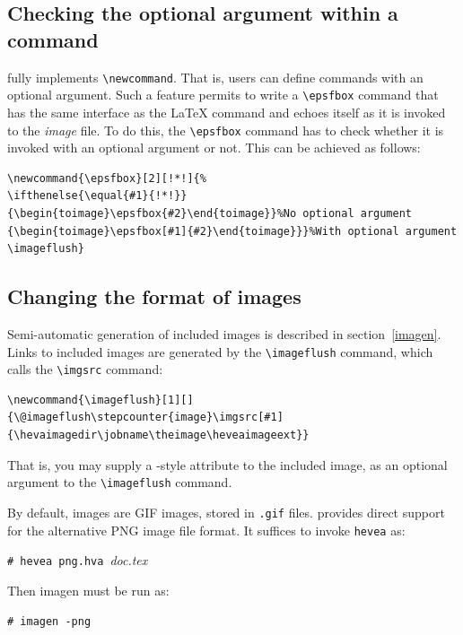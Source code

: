 \subsection{Checking the optional argument within a command}\label{fullepsfbox}
\hevea{} fully implements \LaTeXe{} \verb+\newcommand+.
That is, users can define commands with an optional argument.
Such a feature permits to write a \verb+\epsfbox+ command that
has the same interface as the \LaTeX{} command and
echoes itself as it is invoked to the \textit{image} file.
To do this, the \hevea{} \verb+\epsfbox+ command has to check
whether it is invoked with an optional argument or not.
This can be achieved as follows:
\begin{verbatim}
\newcommand{\epsfbox}[2][!*!]{%
\ifthenelse{\equal{#1}{!*!}}
{\begin{toimage}\epsfbox{#2}\end{toimage}}%No optional argument
{\begin{toimage}\epsfbox[#1]{#2}\end{toimage}}}%With optional argument
\imageflush}
\end{verbatim}

\subsection{Changing the format of images}
Semi-automatic generation of included images is described in
section~\ref{imagen}.
Links to included images are generated by the \verb+\imageflush+
command, which calls the \verb+\imgsrc+ command:
\begin{verbatim}
\newcommand{\imageflush}[1][]
{\@imageflush\stepcounter{image}\imgsrc[#1]{\hevaimagedir\jobname\theimage\heveaimageext}}
\end{verbatim}
That is, you may supply a \html-style attribute to the included image,
as an optional argument to the \verb+\imageflush+ command.

By default, images are GIF images, stored in \texttt{.gif} files.
\hevea{} provides direct support for the alternative PNG image file
format.
It suffices to invoke \texttt{hevea} as:
\begin{flushleft}
\texttt{\#~hevea~png.hva}~\textit{doc.tex}
\end{flushleft}
Then imagen must be run as:
\begin{flushleft}
\texttt{\#~imagen~-png}~
\end{flushleft}

